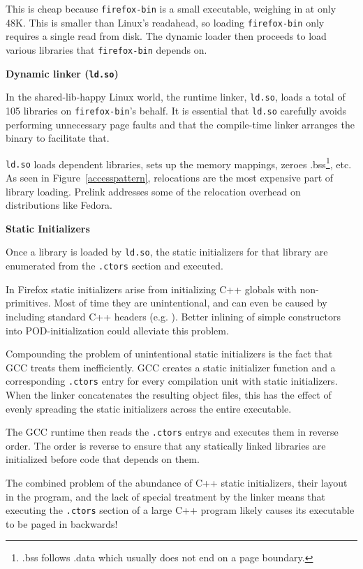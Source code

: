 \documentclass[final]{ols}
\begin{document}
This is cheap because {\tt firefox-bin} is a small executable, weighing in at only 48K. This is smaller
than Linux's readahead, so loading {\tt firefox-bin} only requires a single read from
disk. The dynamic loader then proceeds to load various libraries that
{\tt firefox-bin} depends on.

 
{\bf {Dynamic linker ({\tt ld.so})}}

In the shared-lib-happy Linux world, the runtime linker, {\tt ld.so}, loads a total of
105 libraries on {\tt firefox-bin}'s behalf. It is essential that {\tt ld.so}
carefully avoids performing unnecessary page faults and that the compile-time
linker arranges the binary to facilitate that.

{\tt ld.so} loads dependent libraries, sets up the memory mappings,
zeroes .bss\footnote{.bss follows .data which usually does not end on a page
boundary.}, etc. As seen in Figure~\ref{accesspattern}, relocations are the
most expensive part of library loading. Prelink addresses some of the
relocation overhead on distributions like Fedora.

{\bf Static Initializers}

Once a library is loaded by {\tt ld.so}, the static initializers for that library are
enumerated from the {\tt .ctors} section and executed.

In Firefox static initializers arise from initializing C++ globals with
non-primitives. Most of time they are unintentional, and can even be caused by
including standard C++ headers (e.g. ). Better inlining of simple
constructors into POD-initialization could alleviate this problem.

Compounding the problem of unintentional static initializers is the fact that GCC
treats them inefficiently. GCC creates a static initializer function
and a corresponding {\tt .ctors} entry for every compilation unit with static
initializers. When the linker concatenates the resulting object files, this
has the effect of evenly spreading the static initializers across the entire
executable.

The GCC runtime then reads the {\tt .ctors} entrys and executes them in reverse
order. The order is reverse to ensure that any statically linked libraries are
initialized before code that depends on them.

The combined problem of the abundance of C++ static initializers, their layout
in the program, and the lack of special treatment by the linker means that
executing the {\tt .ctors} section of a large C++ program likely causes its
executable to be paged in backwards!
\end{document}
